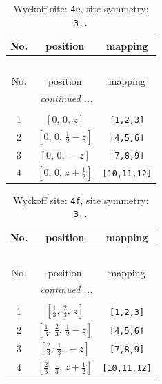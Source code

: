 \documentclass[fleqn,8pt]{jsarticle}
\begin{document}
\begin{longtable}{ccc}
\caption{Wyckoff site: {\tt 4e}, site symmetry: {\tt 3..}}
 \\
 \hline \hline
No. & position & mapping \\ \hline \endfirsthead

\multicolumn{2}{l}{\tablename\ \thetable{}} \\
 \hline \hline
No. & position & mapping \\ \hline \endhead

 \hline \hline
\multicolumn{2}{r}{\footnotesize\it continued ...} \\ \endfoot

 \hline \hline
\multicolumn{2}{r}{} \\ \endlastfoot

1 & $\left[ 0,\, 0,\, z \right]$ & {\tt [1,2,3]} \\ \hline
2 & $\left[ 0,\, 0,\, \frac{1}{2} - z \right]$ & {\tt [4,5,6]} \\ \hline
3 & $\left[ 0,\, 0,\, - z \right]$ & {\tt [7,8,9]} \\ \hline
4 & $\left[ 0,\, 0,\, z + \frac{1}{2} \right]$ & {\tt [10,11,12]} \\
\end{longtable}
\renewcommand{\arraystretch}{1.2}
\begin{longtable}{ccc}
\caption{Wyckoff site: {\tt 4f}, site symmetry: {\tt 3..}}
 \\
 \hline \hline
No. & position & mapping \\ \hline \endfirsthead

\multicolumn{2}{l}{\tablename\ \thetable{}} \\
 \hline \hline
No. & position & mapping \\ \hline \endhead

 \hline \hline
\multicolumn{2}{r}{\footnotesize\it continued ...} \\ \endfoot

 \hline \hline
\multicolumn{2}{r}{} \\ \endlastfoot

1 & $\left[ \frac{1}{3},\, \frac{2}{3},\, z \right]$ & {\tt [1,2,3]} \\ \hline
2 & $\left[ \frac{1}{3},\, \frac{2}{3},\, \frac{1}{2} - z \right]$ & {\tt [4,5,6]} \\ \hline
3 & $\left[ \frac{2}{3},\, \frac{1}{3},\, - z \right]$ & {\tt [7,8,9]} \\ \hline
4 & $\left[ \frac{2}{3},\, \frac{1}{3},\, z + \frac{1}{2} \right]$ & {\tt [10,11,12]} \\
\end{longtable}
\end{document}
